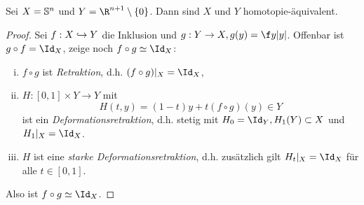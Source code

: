 \begin{ex}
	Sei $X = \S^n$ und $Y = \R^{n+1} \setminus \{0\}$.
	Dann sind $X$ und $Y$ homotopie-äquivalent.
	\begin{proof}
		Sei $f: X \injto Y$ die Inklusion und $g: Y \to X, g(y) = \f y{|y|}$.
		Offenbar ist $g \circ f = \Id_X$, zeige noch $f \circ g \homotopic \Id_X$:
		\begin{enumerate}[i)]
			\item
				$f \circ g$ ist \emph{Retraktion}, d.h. $(f \circ g)|_X = \Id_X$,
			\item
				$H: [0,1] \times Y \to Y$ mit
				\[
					H(t,y) = (1-t)y + t (f \circ g)(y)
					\in Y
				\]
				ist ein \emph{Deformationsretraktion}, d.h. stetig mit $H_0 = \Id_Y, H_1(Y) \subset X$ und $H_1|_X = \Id_X$.
			\item
				$H$ ist eine \emph{starke Deformationsretraktion}, d.h. zusätzlich gilt $H_t|_X = \Id_X$ für alle $t \in [0,1]$.
		\end{enumerate}
		Also ist $f \circ g \homotopic \Id_X$.
	\end{proof}
\end{ex}



